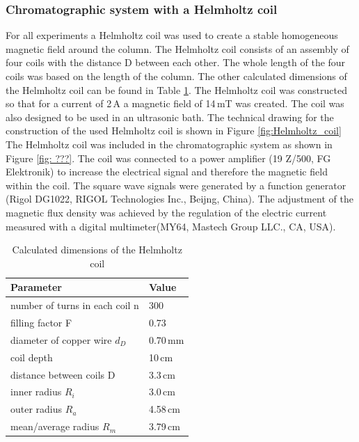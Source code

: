 \subsubsection{Chromatographic system with a Helmholtz coil}
\label{subsubsec:helm_coil}
For all experiments a Helmholtz coil was used to create a stable homogeneous magnetic field around the column. The Helmholtz coil consists of an assembly of four coils with the distance D between each other. The whole length of the four coils was based on the length of the column. The other calculated dimensions of the Helmholtz coil can be found in Table \ref{table:Helmholtz_coil}. The Helmholtz coil was constructed so that for a current of 2\,A a magnetic field of 14\,mT was created. The coil was also designed to be used in an ultrasonic bath. The technical drawing for the construction of the used Helmholtz coil is shown in Figure \ref{fig:Helmholtz_coil}\\  
The Helmholtz coil was included in the chromatographic system as shown in Figure \ref{fig: ???}. The coil was connected to a power amplifier (19 Z/500, FG Elektronik) to increase the electrical signal and therefore the magnetic field within the coil. The square wave signals were generated by a function generator (Rigol DG1022, RIGOL Technologies Inc., Beijng, China). The adjustment of the magnetic flux density was achieved by the regulation of the electric current measured with a digital multimeter(MY64, Mastech Group LLC., CA, USA).   

\begin{table}[H]
\centering
\caption[Dimensions of the Helmholtz coil]{Calculated dimensions of the Helmholtz coil}
\label{table:Helmholtz_coil}
\begin{tabular}{ll}\hline
Parameter &  Value \\
\hline\hline
 number of turns in each coil n & 300 \\
 filling factor F & 0.73\\
 diameter of copper wire $d_{D}$ & 0.70\,mm\\
 coil depth & 10\,cm\\
 distance between coils D & 3.3\,cm \\
 inner radius $R_{i}$ & 3.0\,cm\\ 
 outer radius $R_{a}$ & 4.58\,cm\\
 mean/average radius $R_{m}$ & 3.79\,cm\\
 \hline
\end{tabular}
\end{table}


